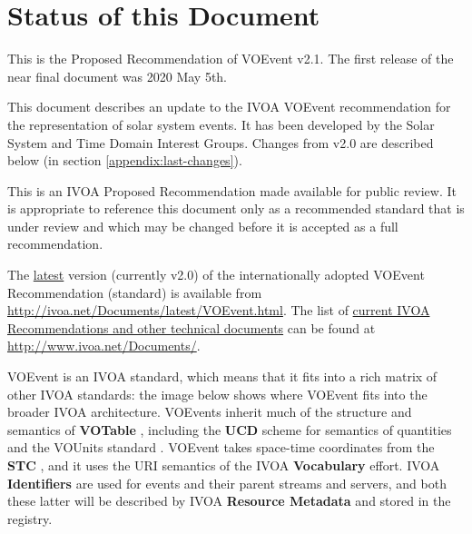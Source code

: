 \documentclass[11pt,a4paper]{ivoa}
\begin{document}
\section*{Status of this Document}
This is the Proposed Recommendation of VOEvent v2.1. The first release of the
near final document was 2020 May 5th.

This document describes an update to the IVOA VOEvent recommendation for the
representation of solar system events. It has been developed by the Solar System
and Time Domain Interest Groups. Changes from v2.0 are described below (in
section \ref{appendix:last-changes}). 

This is an IVOA Proposed Recommendation made available for public review. It is
appropriate to reference this document only as a recommended standard that is
under review and which may be changed before it is accepted as a full
recommendation.

The \href{http://ivoa.net/Documents/latest/VOEvent.html}{latest} version
(currently v2.0) of the internationally adopted VOEvent Recommendation
(standard) is available from \url{http://ivoa.net/Documents/latest/VOEvent.html}.
The list of \href{http://www.ivoa.net/Documents/}{current IVOA Recommendations
and other technical documents} can be found at \url{http://www.ivoa.net/Documents/}.

VOEvent is an IVOA standard, which means that it fits into a rich matrix of
other IVOA standards: the image below shows where VOEvent fits into the broader
IVOA architecture. VOEvents inherit much of the structure and semantics of {\bf
VOTable} \citep{2019ivoa.spec.1021O}, including the {\bf UCD} 
\citep{2018ivoa.spec.0527M} scheme for semantics of quantities and the VOUnits
standard \citep{2014ivoa.spec.0523D}. VOEvent takes space-time coordinates from
the {\bf STC} \citep{2007ivoa.spec.1030R}, and it uses the URI semantics of the
IVOA {\bf Vocabulary} \citep{2009ivoa.spec.1007G} effort. IVOA {\bf Identifiers}
\citep{2016ivoa.spec.0523D} are used for events and their parent streams and
servers, and both these latter will be described by IVOA {\bf Resource Metadata}
\citep{2007ivoa.spec.0302H} and stored in the registry. 
\end{document}

